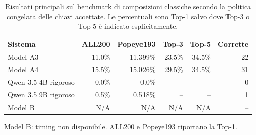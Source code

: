 \begin{table}[H]
    \centering
    \small
    \caption{Risultati principali sul benchmark di composizioni classiche secondo la politica congelata delle chiavi accettate. Le percentuali sono Top-1 salvo dove Top-3 o Top-5 è indicato esplicitamente.}
    \label{tab:classic-results}

    \begin{tabularx}{\textwidth}{>{\raggedright\arraybackslash}Xrrrrr}
        \toprule
        Sistema & ALL200 & Popeye193 & Top-3 & Top-5 & Corrette \\
        \midrule
        Model A3 & 11.0\% & 11.399\% & 23.5\% & 34.5\% & 22 \\
        Model A4 & 15.5\% & 15.026\% & 29.5\% & 34.5\% & 31 \\
        Qwen 3.5 4B rigoroso & 0.0\% & 0.0\% & -- & -- & 0 \\
        Qwen 3.5 9B rigoroso & 0.5\% & 0.518\% & -- & -- & 1 \\
        Model B & N/A & N/A & N/A & N/A & -- \\
        \bottomrule
    \end{tabularx}

    \vspace{0.25em}
    \footnotesize Model B: timing non disponibile. ALL200 e Popeye193 riportano la Top-1.
\end{table}
